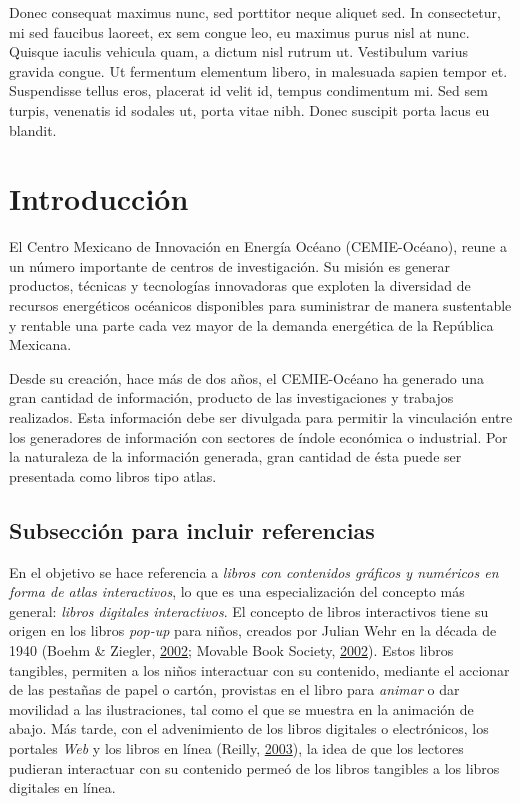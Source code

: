 \documentclass[
]{article}
\begin{document}
Donec consequat maximus nunc, sed porttitor neque aliquet sed. In consectetur, mi sed faucibus laoreet, ex sem congue leo, eu maximus purus nisl at nunc. Quisque iaculis vehicula quam, a dictum nisl rutrum ut. Vestibulum varius gravida congue. Ut fermentum elementum libero, in malesuada sapien tempor et. Suspendisse tellus eros, placerat id velit id, tempus condimentum mi. Sed sem turpis, venenatis id sodales ut, porta vitae nibh. Donec suscipit porta lacus eu blandit.

\hypertarget{intro}{%
\section{Introducción}\label{intro}}

El Centro Mexicano de Innovación en Energía Océano (CEMIE-Océano), reune a un número importante de centros de investigación. Su misión es generar productos, técnicas y tecnologías innovadoras que exploten la diversidad de recursos energéticos océanicos disponibles para suministrar de manera sustentable y rentable una parte cada vez mayor de la demanda energética de la República Mexicana.

Desde su creación, hace más de dos años, el CEMIE-Océano ha generado una gran cantidad de información, producto de las investigaciones y trabajos realizados. Esta información debe ser divulgada para permitir la vinculación entre los generadores de información con sectores de índole económica o industrial. Por la naturaleza de la información generada, gran cantidad de ésta puede ser presentada como libros tipo atlas.

\hypertarget{subsecciuxf3n-para-incluir-referencias}{%
\subsection{Subsección para incluir referencias}\label{subsecciuxf3n-para-incluir-referencias}}

En el objetivo se hace referencia a \emph{libros con contenidos gráficos y numéricos en forma de atlas interactivos}, lo que es una especialización del concepto más general: \emph{libros digitales interactivos}. El concepto de libros interactivos tiene su origen en los libros \emph{pop-up} para niños, creados por Julian Wehr en la década de 1940 (Boehm \& Ziegler, \protect\hyperlink{ref-Bohem2002}{2002}; Movable Book Society, \protect\hyperlink{ref-MBS2002}{2002}). Estos libros tangibles, permiten a los niños interactuar con su contenido, mediante el accionar de las pestañas de papel o cartón, provistas en el libro para \emph{animar} o dar movilidad a las ilustraciones, tal como el que se muestra en la animación de abajo. Más tarde, con el advenimiento de los libros digitales o electrónicos, los portales \emph{Web} y los libros en línea (Reilly, \protect\hyperlink{ref-Reilly2003}{2003}), la idea de que los lectores pudieran interactuar con su contenido permeó de los libros tangibles a los libros digitales en línea.
\end{document}
